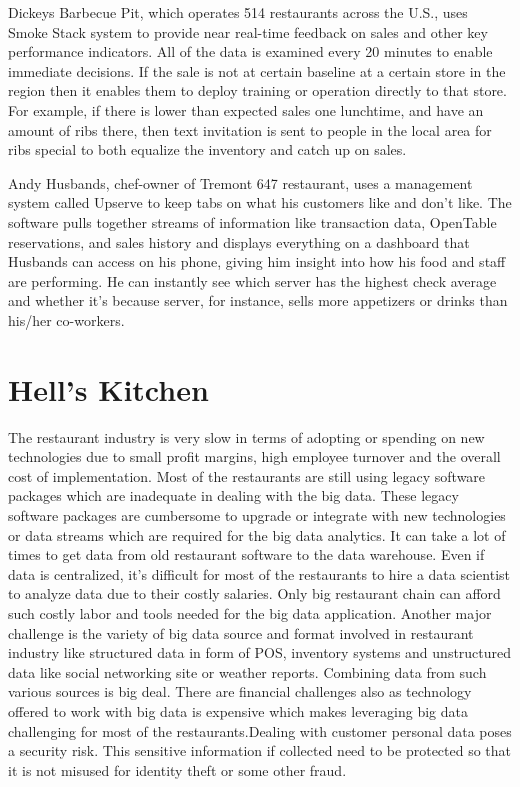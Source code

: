 \documentclass[sigconf]{acmart}
\begin{document}
Dickeys Barbecue Pit, which operates 514 restaurants across the U.S., uses Smoke Stack system to provide near real-time feedback on sales and other key performance indicators. All of the data is examined every 20 minutes to enable immediate decisions. If the sale is not at certain baseline at a certain store in the region then it enables them to deploy training or operation directly to that store. For example, if there is lower than expected sales one lunchtime, and have an amount of ribs there, then text invitation is sent to people in the local area for ribs special to both equalize the inventory and catch up on sales.\cite{www-forbes}
 
Andy Husbands, chef-owner of Tremont 647 restaurant, uses a management system called Upserve to keep tabs on what his customers like and don't like. 
The software pulls together streams of information like transaction data, OpenTable reservations, and sales history and displays everything on a dashboard that Husbands can access on his phone, giving him insight into how his food and staff are performing. He can instantly see which server has the highest check 
average and whether it's because server, for instance, sells more appetizers or drinks than his/her co-workers.\cite{www-bostonglobe}

\section{Hell's Kitchen}
The restaurant industry is very slow in terms of adopting or spending on new technologies due to small profit margins, high employee turnover and the overall cost of implementation\cite{www-bostonglobe}. Most of the restaurants are still using legacy software packages which are inadequate in dealing with the big data. These legacy software packages are cumbersome to upgrade or integrate with new technologies or data streams which are required for the big data analytics. It can take a lot of times to get data from old restaurant software to the data warehouse. Even if data is centralized, it's difficult for most of the restaurants to hire a data scientist to analyze data due to their costly salaries. Only big restaurant chain can afford such costly labor and tools needed for the big data application\cite{2015BDLC}. Another major challenge is the variety of big data source and format involved in restaurant industry like structured data in form of POS, inventory systems and unstructured data like social networking site or weather reports. Combining data from such various sources is big deal. There are financial challenges also as technology offered to work with big data is expensive which makes leveraging big data challenging for most of the restaurants.\cite{www-foodnewsfeed}Dealing with customer personal data poses a security risk. This sensitive information if collected need to be protected so that it is not misused for identity theft or some other fraud.\cite{www-restaurant}
\end{document}
